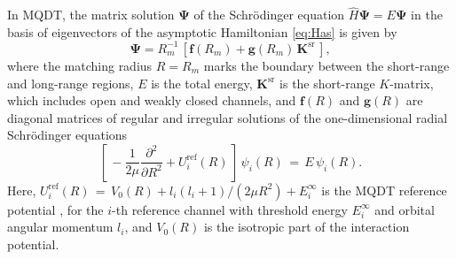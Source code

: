 \documentclass[reprint,amssymb,noeprint,twocolumn,longbibliography]{revtex4-2}
\begin{document}




In MQDT, the matrix solution $\bm{\Psi}$ of the Schr\"odinger equation $\hat{H}\bm{\Psi}=E\bm{\Psi}$ in the basis of eigenvectors of the asymptotic Hamiltonian \eqref{eq:Has} is given by \cite{Mies_00,Croft_11} 
\begin{equation}
\label{eq:MQDT}
\bm{\Psi}= R_{m}^{-1}\,[\bm{f}(R_{m})+\bm{g}(R_{m})\,\bm{K}^{\text{sr}}\,],
\end{equation}
where the matching radius $R=R_m$ marks the boundary between the short-range and long-range regions, $E$ is the total energy, 
 $\bm{K}^{\text{sr}}$ is the short-range $K$-matrix, which includes open and weakly closed channels, and $\bm{f}(R)$ and $\bm{g}(R)$ are diagonal matrices of regular and irregular 
solutions of the one-dimensional radial Schr\"odinger equations
\begin{equation}
\label{eq:1Deq}
\left[\, - \frac{1}{2\mu} \frac{\partial^2}{\partial R^2} + U_i^\text{ref}(R)\, \right]\, \psi_i(R)\,=\, E\,\psi_i(R).
\end{equation}
Here, 
$U_i^\text{ref}(R)\, =\, V_0(R) + {l_i(l_i+1)}/{(2\mu R^2)} + E_i^{\infty}$ is the MQDT reference potential \cite{Croft_11,SM}, for the $i$-th reference channel with threshold energy $E_i^{\infty}$ and orbital angular momentum $l_i$, and $V_0(R)$  is the isotropic part of the interaction potential. 
\end{document}
